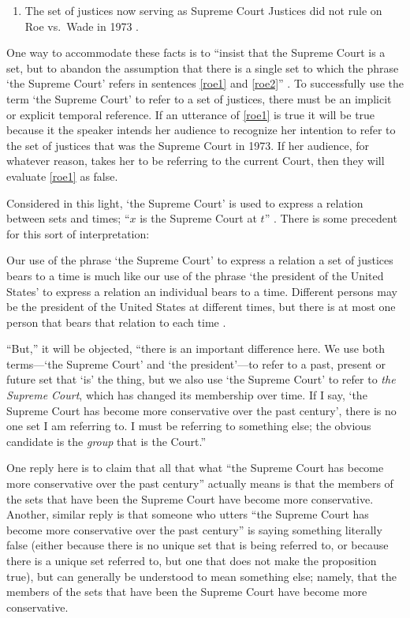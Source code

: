\documentclass[11pt]{article}
\newenvironment{squote}{%
\begin{spacing}{1}
\begin{list}{}{%
\setlength{\labelwidth}{0pt}%
\rightmargin\leftmargin%
}
\item\relax
}{%
\end{list}%
\end{spacing}
}
\begin{document}
\begin{spacing}{1.5}
\begin{enumerate}[ref=(\arabic*)]
  \item The set of justices now serving as Supreme Court Justices did
    not rule on Roe vs.\ Wade in 1973
    \citep[135]{uzquiano2004a}. \label{roe2}
\end{enumerate}

One way to accommodate these facts is to ``insist that the Supreme
Court is a set, but to abandon the assumption that there is a single
set to which the phrase `the Supreme Court' refers in sentences
\ref{roe1} and \ref{roe2}'' \citep[138]{uzquiano2004a}.  To
successfully use the term `the Supreme Court' to refer to a set of
justices, there must be an implicit or explicit temporal reference.
If an utterance of \ref{roe1} is true it will be true because it the
speaker intends her audience to recognize her intention to refer to
the set of justices that was the Supreme Court in 1973.  If her
audience, for whatever reason, takes her to be referring to the
current Court, then they will evaluate \ref{roe1} as false.

Considered in this light, `the Supreme Court' is used to express a
relation between sets and times; ``$x$ is the Supreme Court at $t$''
\citep[140]{uzquiano2004a}.  There is some precedent for this sort of
interpretation:

\begin{squote}
Our use of the phrase `the Supreme Court' to express a relation a set
of justices bears to a time is much like our use of the phrase `the
president of the United States' to express a relation an individual
bears to a time.  Different persons may be the president of the United
States at different times, but there is at most one person that bears
that relation to each time \citep[138]{uzquiano2004a}.
\end{squote}

``But,'' it will be objected, ``there is an important difference here.
We use both terms---`the Supreme Court' and `the president'---to refer
to a past, present or future set that `is' the thing, but we also use
`the Supreme Court' to refer to {\em the Supreme Court}, which has
changed its membership over time.  If I say, `the Supreme Court has
become more conservative over the past century', there is no one set I
am referring to.  I must be referring to something else; the obvious
candidate is the {\em group} that is the Court.''

One reply here is to claim that all that what ``the Supreme Court has
become more conservative over the past century'' actually means is
that the members of the sets that have been the Supreme Court have
become more conservative.  Another, similar reply is that someone who
utters ``the Supreme Court has become more conservative over the past
century'' is saying something literally false (either because there is
no unique set that is being referred to, or because there is a unique
set referred to, but one that does not make the proposition true), but
can generally be understood to mean something else; namely, that the
members of the sets that have been the Supreme Court have become more
conservative.


\end{spacing}
\end{document}
